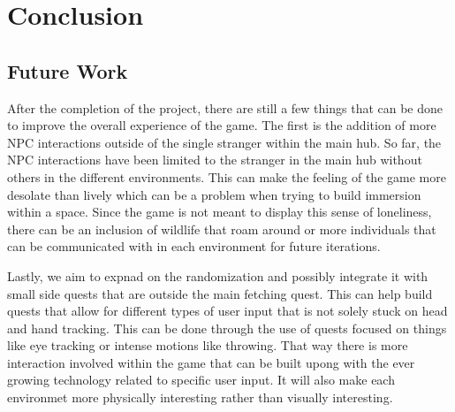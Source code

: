\documentclass{vgtc}                          %
\begin{document}
\section{Conclusion}
\subsection*{Future Work}
After the completion of the project, there are still a few things that can be done to improve the overall experience of the game. The first is the addition of more NPC interactions outside of the single stranger within the main hub. So far, the NPC interactions have been limited to the stranger in the main hub without others in the different environments. This can make the feeling of the game more desolate than lively 
which can be a problem when trying to build immersion within a space. Since the game is not meant to display this sense of loneliness, there can be an inclusion of wildlife that roam around or more individuals that can be communicated with in each environment for future iterations. 

Lastly, we aim to expnad on the randomization and possibly integrate it with small side quests that are outside the main fetching quest. This can help build quests that allow for different types of user input that is not solely stuck on head and hand tracking. This can be done through the use of quests focused on things like eye tracking or intense motions like throwing. That way there is more interaction involved within
the game that can be built upong with the ever growing technology related to specific user input. It will also make each environmet more physically interesting rather than visually interesting.


%

%
%
%


\end{document}
